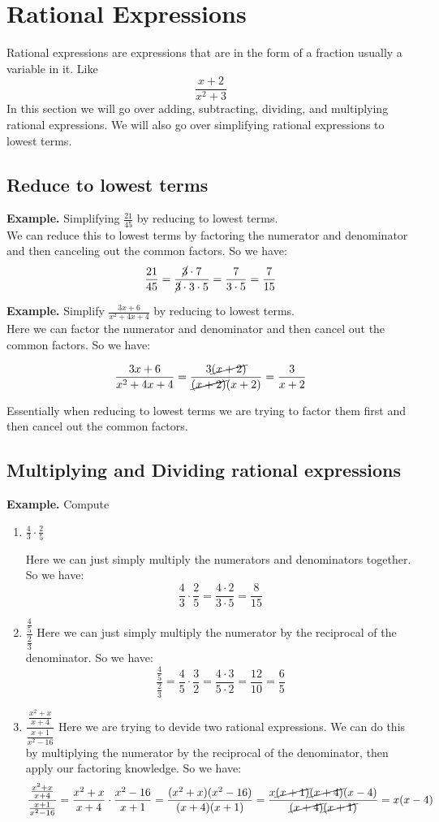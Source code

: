 \section{Rational Expressions}
Rational expressions are expressions that are in the form of a fraction usually a variable in it. Like
$$ \frac{x+2}{x^2+3}$$
In this section we will go over adding, subtracting, dividing, and multiplying rational expressions. We will also go over simplifying rational expressions to lowest terms.

\subsection{Reduce to lowest terms}
\textbf{Example.} Simplifying $\displaystyle \frac{21}{45}$  by reducing to lowest terms. \\
We can reduce this to lowest terms by factoring the numerator and denominator and then canceling out the common factors. So we have: 
$$ \frac{21}{45} = \frac{\cancel{3} \cdot 7}{\cancel{3} \cdot 3 \cdot 5} = \frac{7}{3 \cdot 5} = \frac{7}{15}$$

\textbf{Example.} Simplify $\displaystyle \frac{3x+6}{x^2+4x+4}$ by reducing to lowest terms. \\
Here we can factor the numerator and denominator and then cancel out the common factors. So we have:

$$ \frac{3x+6}{x^2+4x+4} = \frac{3\cancel{(x+2)}}{\cancel{(x+2)}(x+2)} = \frac{3}{x+2}$$


Essentially when reducing to lowest terms we are trying to factor them first and then cancel out the common factors.

\subsection{Multiplying and Dividing rational expressions}
\textbf{Example.} Compute 

\begin{enumerate}
    \item $\displaystyle \frac{4}{3} \cdot \frac{2}{5}$
    
    Here we can just simply multiply the numerators and denominators together. So we have:
    $$ \frac{4}{3} \cdot \frac{2}{5} = \frac{4 \cdot 2}{3 \cdot 5} = \frac{8}{15}$$
    \item $\dfrac{\frac{4}{5}}{\frac{2}{3}}$
    Here we can just simply multiply the numerator by the reciprocal of the denominator. So we have:
    $$ \frac{\frac{4}{5}}{\frac{2}{3}} = \frac{4}{5} \cdot \frac{3}{2} = \frac{4 \cdot 3}{5 \cdot 2} = \frac{12}{10} = \frac{6}{5}$$
    \item $ \displaystyle \dfrac{ \displaystyle \frac{x^2+x}{x+4}}{ \displaystyle \frac{x+1}{x^2-16}}$
    Here we are trying to devide two rational expressions. We can do this by multiplying the numerator by the reciprocal of the denominator, then apply our factoring knowledge. So we have:
    $$ \frac{\frac{x^2+x}{x+4}}{ \frac{x+1}{x^2-16}} = \frac{x^2+x}{x+4} \cdot \frac{x^2-16}{x+1} = \frac{(x^2+x)(x^2-16)}{(x+4)(x+1)} = \frac{x\cancel{(x+1)}\cancel{(x+4)}(x-4)}{\cancel{(x+4)}\cancel{(x+1)}} = x(x-4)$$
\end{enumerate}

